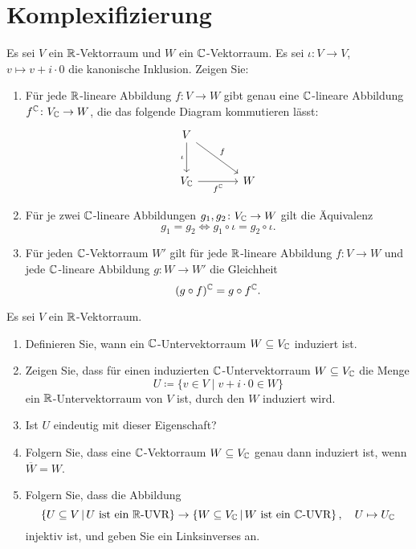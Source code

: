 \section{Komplexifizierung}


\begin{question}
  Es sei $V$ ein $\mathbb{R}$-Vektorraum und $W$ ein $\mathbb{C}$-Vektorraum.
  Es sei $\iota \colon V \to V$, $v \mapsto v + i \cdot 0$ die kanonische Inklusion.
  Zeigen Sie:
  \begin{enumerate}[leftmargin=*]
    \item
      Für jede $\mathbb{R}$-lineare Abbildung $f \colon V \to W$ gibt genau eine $\mathbb{C}$-lineare Abbildung $f^{\mathbb{C}} \colon V_{\mathbb{C}} \to W$, die das folgende Diagram kommutieren lässt:
      \[
        \begin{tikzcd}[row sep = large, column sep = large, ampersand replacement=\&]
                V       \arrow{d}[swap]{\iota}
                        \arrow{rd}{f}
            \&  {}
          \\
                V_\Cbb  \arrow{r}[swap]{f^\Cbb}
            \&  W
        \end{tikzcd}
      \]
    \item
      Für je zwei $\mathbb{C}$-lineare Abbildungen $g_1, g_2 \colon V_{\mathbb{C}} \to W$ gilt die Äquivalenz
      \[
        g_1 = g_2
        \iff
        g_1 \circ \iota = g_2 \circ \iota.
      \]
    \item
      Für jeden $\mathbb{C}$-Vektorraum $W'$ gilt für jede $\mathbb{R}$-lineare Abbildung $f \colon V \to W$ und jede $\mathbb{C}$-lineare Abbildung $g \colon W \to W'$ die Gleichheit
      \[
        (g \circ f)^{\mathbb{C}} = g \circ f^{\mathbb{C}}.
      \]
  \end{enumerate}
\end{question}


\begin{question}
  Es sei $V$ ein $\mathbb{R}$-Vektorraum.
  \begin{enumerate}
    \item
      Definieren Sie, wann ein $\mathbb{C}$-Untervektorraum $W \subseteq V_{\mathbb{C}}$ induziert ist.
    \item
      Zeigen Sie, dass für einen induzierten $\mathbb{C}$-Untervektorraum $W \subseteq V_{\mathbb{C}}$ die Menge
      \[
        U \coloneqq \{ v \in V \mid v + i \cdot 0 \in W \}
      \]
      ein $\mathbb{R}$-Untervektorraum von $V$ ist, durch den $W$ induziert wird.
    \item
      Ist $U$ eindeutig mit dieser Eigenschaft?
    \item
      Folgern Sie, dass eine $\mathbb{C}$-Vektorraum $W \subseteq V_{\mathbb{C}}$ genau dann induziert ist, wenn $\overline{W} = W$.
    \item
      Folgern Sie, dass die Abbildung
      \[
        \left\{
          U \subseteq V
        \,\middle|\,
          \text{$U$ ist ein $\mathbb{R}$-UVR}
        \right\}
        \to
        \left\{
          W \subseteq V_{\mathbb{C}}
         \,\middle|\,
          \text{$W$ ist ein $\mathbb{C}$-UVR}
        \right\},
        \quad
        U \mapsto U_{\mathbb{C}}
      \]
      injektiv ist, und geben Sie ein Linksinverses an.
  \end{enumerate}
\end{question}


